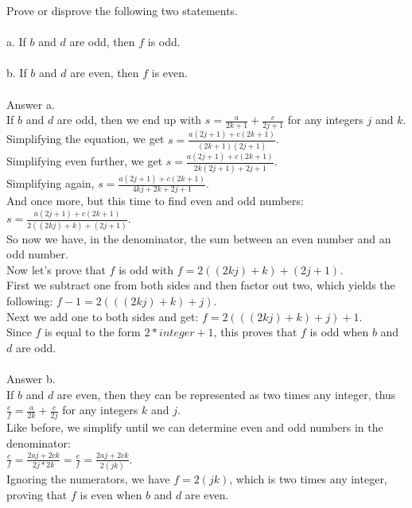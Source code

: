 \documentclass{amsart}
\theoremstyle{definition}
\theoremstyle{Exercise}
\theoremstyle{remark}
\theoremstyle{rule}
\numberwithin{equation}{section}
\begin{document}
 Prove or disprove the following two statements.
\\\\
a.  If $b$ and $d$ are odd, then $f$ is odd.
\\\\
b. If $b$ and $d$ are even, then $f$ is even.
\\\\
Answer a.\\
If $b$ and $d$ are odd, then we end up with $s = \frac{a}{2k + 1} + \frac{c}{2j + 1}$ for any integers $j$ and $k$.\\
Simplifying the equation, we get $s = \frac{a(2j + 1) + c(2k + 1)}{(2k+1)(2j+1)}$.\\
Simplifying even further, we get $s = \frac{a(2j + 1) + c(2k + 1)}{2k(2j+1)+2j+1}$.\\
Simplifying again, $s = \frac{a(2j + 1) + c(2k + 1)}{4kj+2k+2j+1}$.\\
And once more, but this time to find even and odd numbers: $s = \frac{a(2j + 1) + c(2k + 1)}{2((2kj)+k)+(2j+1)}$.\\
So now we have, in the denominator, the sum between an even number and an odd number.\\
Now let's prove that $f$ is odd with $f = 2((2kj)+k)+(2j+1)$.\\
First we subtract one from both sides and then factor out two, which yields the following: $f - 1 = 2(((2kj)+k)+j)$.\\
Next we add one to both sides and get: $f = 2(((2kj)+k)+j) + 1$.\\
Since $f$ is equal to the form $2*integer + 1$, this proves that $f$ is odd when $b$ and $d$ are odd.
\\\\
Answer b.\\
If $b$ and $d$ are even, then they can be represented as two times any integer, thus $\frac{e}{f} = \frac{a}{2k} + \frac{c}{2j}$ for any integers $k$ and $j$.\\
Like before, we simplify until we can determine even and odd numbers in the denominator:\\
$\frac{e}{f} = \frac{2aj + 2ck}{2j*2k} = \frac{e}{f} = \frac{2aj + 2ck}{2(jk)}$.\\
Ignoring the numerators, we have $f = 2(jk)$, which is two times any integer, proving that $f$ is even when $b$ and $d$ are even.
\\\\
\end{document}
